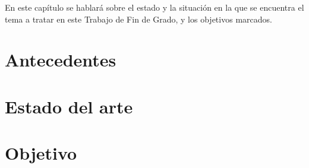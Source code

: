 
En este capítulo se hablará sobre el estado y la situación en la que se
encuentra el tema a tratar en este Trabajo de Fin de Grado, y los objetivos
marcados.

\section{Antecedentes}
\label{1:sec:1}


\section{Estado del arte}
\label{1:sec:2}


\section{Objetivo}
\label{1:sec:3}


